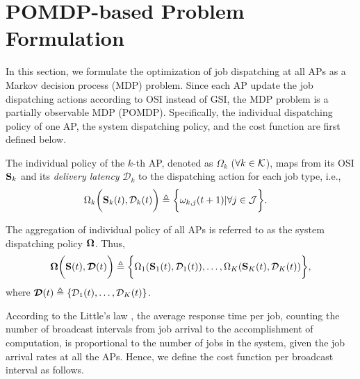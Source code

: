 \section{POMDP-based Problem Formulation}
\label{sec:formulation}
In this section, we formulate the optimization of job dispatching at all APs as a Markov decision process (MDP) problem.
Since each AP update the job dispatching actions according to OSI instead of GSI, the MDP problem is a partially observable MDP (POMDP).
Specifically, the individual dispatching policy of one AP, the system dispatching policy, and the cost function are first defined below.

\begin{definition}
    The individual policy of the $k$-th AP, denoted as $\Omega_{k}$ ($\forall k \in\mathcal{K}$), maps from its OSI $\mathbf{S}_{k}$ and its \emph{delivery latency} $\mathcal{D}_{k}$ to the dispatching action for each job type, i.e.,
    \begin{align}
        &\Omega_{k} \bigg( \mathbf{S}_{k}(t), \mathcal{D}_{k}(t) \bigg)
        \triangleq \bigg\{
            \omega_{k,j}(t+1)|\forall j\in\mathcal{J}
        \bigg\}.
        \label{def:action}
    \end{align}

    The aggregation of individual policy of all APs is referred to as the system dispatching policy $\boldsymbol{\Omega}$.
    Thus,
    {\small
    \begin{align}
        \boldsymbol{\Omega}\bigg( \mathbf{S}(t), \boldsymbol{\mathcal{D}}(t) \bigg) \triangleq \bigg\{
            \Omega_{1}(\mathbf{S}_{1}(t), \mathcal{D}_{1}(t)), \dots, \Omega_{K}(\mathbf{S}_{K}(t),\mathcal{D}_{K}(t))
        \bigg\},
    \end{align}
    }
    where $\boldsymbol{\mathcal{D}}(t) \triangleq \{ \mathcal{D}_{1}(t), \dots, \mathcal{D}_{K}(t) \}$.
\end{definition}

According to the Little's law \cite{Little1961}, the average response time per job, counting the number of broadcast intervals from job arrival to the accomplishment of computation, is proportional to the number of jobs in the system, given the job arrival rates at all the APs.
Hence, we define the cost function per broadcast interval as follows.

